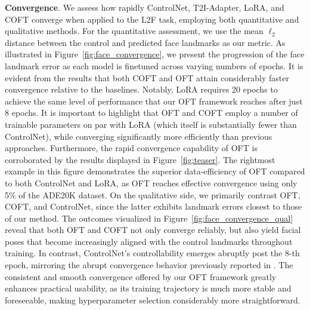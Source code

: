 \textbf{Convergence}. We assess how rapidly ControlNet, T2I-Adapter, LoRA, and COFT converge when applied to the L2F task, employing both quantitative and qualitative methods. For the quantitative assessment, we use the mean $\ell_2$ distance between the control and predicted face landmarks as our metric. As illustrated in Figure~\ref{fig:face_convergence}, we present the progression of the face landmark error as each model is finetuned across varying numbers of epochs. It is evident from the results that both COFT and OFT attain considerably faster convergence relative to the baselines. Notably, LoRA requires 20 epochs to achieve the same level of performance that our OFT framework reaches after just 8 epochs. It is important to highlight that OFT and COFT employ a number of trainable parameters on par with LoRA (which itself is substantially fewer than ControlNet), while converging significantly more efficiently than previous approaches. Furthermore, the rapid convergence capability of OFT is corroborated by the results displayed in Figure~\ref{fig:teaser}. The rightmost example in this figure demonstrates the superior data-efficiency of OFT compared to both ControlNet and LoRA, as OFT reaches effective convergence using only 5\% of the ADE20K dataset. On the qualitative side, we primarily contrast OFT, COFT, and ControlNet, since the latter exhibits landmark errors closest to those of our method. The outcomes visualized in Figure~\ref{fig:face_convergence_qual} reveal that both OFT and COFT not only converge reliably, but also yield facial poses that become increasingly aligned with the control landmarks throughout training. In contrast, ControlNet's controllability emerges abruptly post the 8-th epoch, mirroring the abrupt convergence behavior previously reported in \cite{zhang2023adding}. The consistent and smooth convergence offered by our OFT framework greatly enhances practical usability, as its training trajectory is much more stable and foreseeable, making hyperparameter selection considerably more straightforward.

